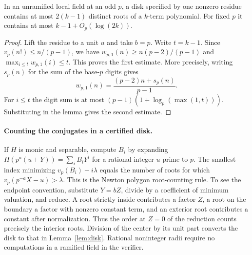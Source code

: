 \begin{corollary}\label{cor:coarse}
In an unramified local field at an odd $p$, a disk specified by one nonzero residue contains at most $2(k-1)$ distinct roots of a $k$-term polynomial. For fixed $p$ it contains at most $k-1+O_p(\log(2k))$.
\end{corollary}
\begin{proof}
Lift the residue to a unit $u$ and take $b=p$. Write $t=k-1$. Since $v_p(n!)\le n/(p-1)$, we have $w_{p,1}(n)\ge n(p-2)/(p-1)$ and $\max_{i\le t}w_{p,1}(i)\le t$. This proves the first estimate. More precisely, writing $s_p(n)$ for the sum of the base-$p$ digits gives
\[
 w_{p,1}(n)=\frac{(p-2)n+s_p(n)}{p-1}.
\]
For $i\le t$ the digit sum is at most $(p-1)(1+\log_p(\max(1,t)))$. Substituting in the lemma gives the second estimate.
\end{proof}

\paragraph{Counting the conjugates in a certified disk.}
If $H$ is monic and separable, compute $B_i$ by expanding $H(p^a(u+Y))=\sum_i B_iY^i$ for a rational integer $u$ prime to $p$. The smallest index minimizing $v_p(B_i)+i\lambda$ equals the number of roots for which $v_p(p^{-a}X-u)>\lambda$. This is the Newton polygon root-counting rule. To see the endpoint convention, substitute $Y=bZ$, divide by a coefficient of minimum valuation, and reduce. A root strictly inside contributes a factor $Z$, a root on the boundary a factor with nonzero constant term, and an exterior root contributes a constant after normalization. Thus the order at $Z=0$ of the reduction counts precisely the interior roots. Division of the center by its unit part converts the disk to that in Lemma~\ref{lem:disk}. Rational noninteger radii require no computations in a ramified field in the verifier.
